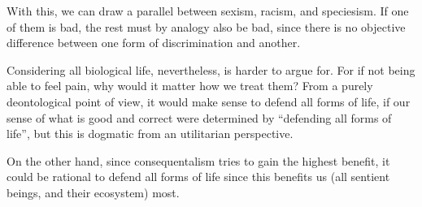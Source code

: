 \documentclass{myassignment}
\begin{document}
\begin{answer}
		With this, we can draw a parallel between sexism, racism, and speciesism. If one of them is bad, the rest must by analogy also be bad, since there is no objective difference between one form of discrimination and another.

		Considering all biological life, nevertheless, is harder to argue for. For if not being able to feel pain, why would it matter how we treat them? From a purely deontological point of view, it would make sense to defend all forms of life, if our sense of what is good and correct were determined by ``defending all forms of life'', but this is dogmatic from an utilitarian perspective. 

		On the other hand, since consequentalism tries to gain the highest benefit, it could be rational to defend all forms of life since this benefits us (all sentient beings, and their ecosystem) most.
 	\end{answer}
\end{document}
